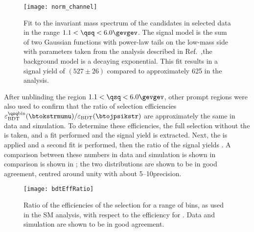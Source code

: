 \begin{figure}
  \begin{center}
    \texttt{[image: norm\_channel]}
    \caption[Fit to the normalization channel, \btokstrmumu for $1.1<\qsq<6.0\gevgev$]
    {
      Fit to the invariant mass spectrum of the \Bd candidates in selected data in the range
      $1.1<\qsq<6.0\gevgev$.
      The signal model is the sum of two Gaussian functions with power-law tails on the low-mass
      side with parameters taken from the analysis described in
      Ref.~\protect\cite{LHCb-CONF-2015-002},the background model is a decaying exponential.
      This fit results in a signal yield of $(527\pm26)$ compared to approximately 625 in the \sm
      analysis.
    }
    \label{fig:db:norm}
  \end{center}
\end{figure}

After unblinding the region $1.1<\qsq<6.0\gevgev$, other prompt \qsq regions were also used to
confirm that the ratio of \bdt selection efficiencies
$\varepsilon_\mathrm{BDT}^\mathrm{\qsq bin}(\btokstrmumu) / \varepsilon_\mathrm{BDT}(\btojpsikstr)$
are approximately the same in data and simulation.
To determine these efficiencies, the full selection without the \BDT is taken, and a fit performed
and the signal yield is extracted.
Next, the \BDT is applied and a second fit is performed, then  the ratio of the signal
yields .
A comparison between these numbers in data and simulation is shown in comparison is shown in
; the two distributions are shown to be in good agreement, centred around
unity with about 5--10\pc precision.

\begin{figure}
  \begin{center}
    \texttt{[image: bdtEffRatio]}
    \caption[Efficiency ratios]
    {
      Ratio of the efficiencies of the \bdt selection for a range of \qsq bins, as used in the SM
      \btokstrmumu analysis, with respect to the efficiency for \decay{\Bd}{\jpsi\Kstarz}.
      Data and simulation are shown to be in good agreement.
    }
    \label{fig:bdtEffRatio}
  \end{center}
\end{figure}

